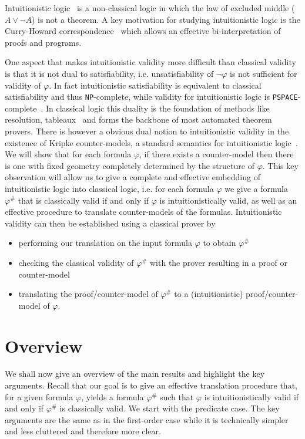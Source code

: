\documentclass[a4paper,UKenglish,cleveref, autoref, thm-restate]{lipics-v2021}
\begin{document}
Intuitionistic logic~\cite{sep-logic-intuitionistic} is a non-classical logic in which the law of excluded middle ($A\vee \neg A$) is not a theorem. A key motivation for studying intuitionistic logic is the Curry-Howard correspondence~\cite{howard1980formulae} which allows an effective bi-interpretation of proofs and programs.

One aspect that makes intuitionistic validity more difficult than classical validity is that it is not dual to satisfiability, i.e. unsatisfiability of $\neg\varphi$ is not sufficient for validity of $\varphi$. In fact intuitionistic satisfiability is equivalent to classical satisfiability and thus \verb+NP+-complete, while validity for intuitionistic logic is \verb+PSPACE+-complete~\cite{statman1979intuitionistic}. In classical logic this duality is the foundation of methods like resolution, tableaux~\cite{fitting2012first} and forms the backbone of most automated theorem provers. There is however a obvious dual notion to intuitionistic validity in the existence of Kripke counter-models, a standard semantics for intuitionistic logic~\cite{sep-logic-intuitionistic}. We will show that for each formula $\varphi$, if there exists a counter-model then there is one with fixed geometry completely determined by the structure of $\varphi$. This key observation will allow us to give a complete and effective embedding of intuitionistic logic into classical logic, i.e. for each formula $\varphi$ we give a formula $\varphi^\#$ that is classically valid if and only if $\varphi$ is intuitionistically valid, as well as an effective procedure to translate counter-models of the formulas. Intuitionistic validity can then be established using a classical prover by
\begin{itemize}
	\item performing our translation on the input formula $\varphi$ to obtain $\varphi^\#$
	\item checking the classical validity of $\varphi^\#$ with the prover resulting in a proof or counter-model
	\item translating the proof/counter-model of $\varphi^\#$ to a (intuitionistic) proof/counter-model of $\varphi$.
\end{itemize}



\section{Overview}

We shall now give an overview of the main results and highlight the key arguments. Recall that our goal is to give an effective translation procedure that, for a given formula $\varphi$, yields a formula $\varphi^\#$ such that $\varphi$ is intuitionistically valid if and only if $\varphi^\#$ is classically valid. We start with the predicate case. The key arguments are the same as in the first-order case while it is technically simpler and less cluttered and therefore more clear.
\end{document}
